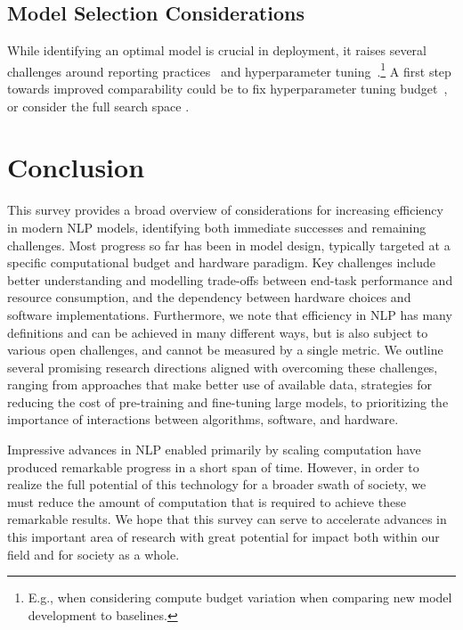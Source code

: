 \subsection{Model Selection Considerations} While identifying an optimal model is  crucial in deployment, it  raises several challenges around reporting practices~\citep{reimers-gurevych-2017-reporting,NEURIPS2021_f514cec8} and hyperparameter tuning~\citep{bouthillier2020survey, gundersen2022sources}.\footnote{E.g., when considering  compute budget variation when comparing new model development to baselines.} A first step towards improved comparability could be to fix hyperparameter tuning  budget~\citep{Dodge:2019,Hoffmann2022}, or consider the full search space \cite{bell2022modeling}.

\section{Conclusion}
This survey provides a broad overview of considerations for increasing efficiency in modern NLP models, identifying both immediate successes and remaining challenges. Most progress so far has been in model design, typically targeted at a specific computational budget and hardware paradigm. Key challenges include better understanding and modelling trade-offs between end-task performance and resource consumption, and the dependency between hardware choices and software implementations. Furthermore, we note that efficiency in NLP has many definitions and can be achieved in many different ways, but is also subject to various open challenges, and cannot be measured by a single metric. We outline several promising research directions aligned with overcoming these challenges, ranging from approaches that make better use of available data, strategies for reducing the cost of pre-training and fine-tuning large models, to prioritizing the importance of interactions between algorithms, software,  and hardware. 

Impressive advances in NLP enabled primarily by scaling computation have produced remarkable progress in a short span of time. However, in order to realize the full potential of this technology for a broader swath of society, we must reduce the amount of computation that is required to achieve these remarkable results. We hope that this survey can serve to accelerate advances in this important area of research with great potential for impact both within our field and for society as a whole.


